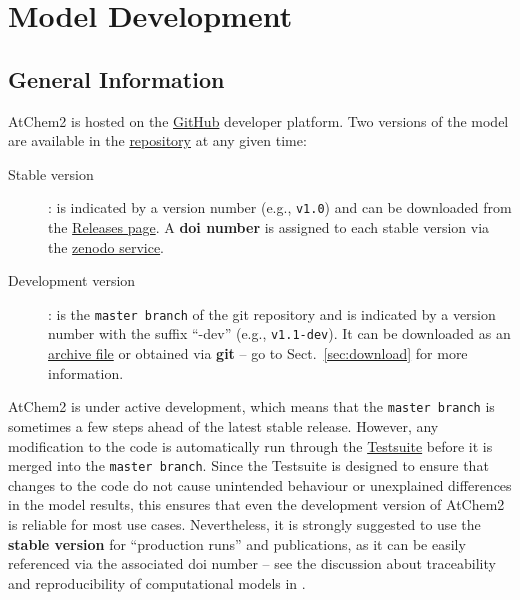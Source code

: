 %
%
%
%

\chapter{Model Development} \label{ch:development}

\section{General Information} \label{sec:general-information}

AtChem2 is hosted on the \href{https://github.com}{GitHub} developer
platform. Two versions of the model are available in the
\href{https://github.com/AtChem/AtChem2}{repository} at any given
time:

\begin{description}
\item[Stable version]: is indicated by a version number
  (e.g., \texttt{v1.0}) and can be downloaded from the
  \href{https://github.com/AtChem/AtChem2/releases}{Releases page}.
  A \textbf{doi number} is assigned to each stable version via the
  \href{https://zenodo.org}{zenodo service}.
\item[Development version]: is the \texttt{master\ branch} of the git
  repository and is indicated by a version number with the suffix
  ``-dev'' (e.g., \texttt{v1.1-dev}). It can be downloaded as an
  \href{https://github.com/AtChem/AtChem2/archive/master.zip}{archive file}
  or obtained via \textbf{git} -- go to Sect.~\ref{sec:download} for
  more information.
\end{description}

AtChem2 is under active development, which means that the
\texttt{master\ branch} is sometimes a few steps ahead of the latest
stable release. However, any modification to the code is automatically
run through the \hyperref[sec:test-suite]{Testsuite} before it is
merged into the \texttt{master\ branch}. Since the Testsuite is
designed to ensure that changes to the code do not cause unintended
behaviour or unexplained differences in the model results, this
ensures that even the development version of AtChem2 is reliable for
most use cases. Nevertheless, it is strongly suggested to use the
\textbf{stable version} for ``production runs'' and publications, as it
can be easily referenced via the associated doi number -- see the
discussion about traceability and reproducibility of computational
models in \citet{sommariva_2020}.

